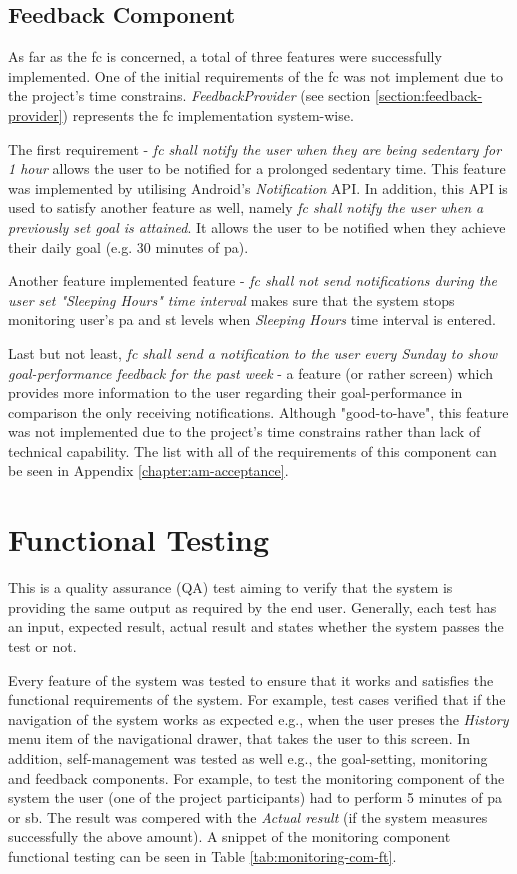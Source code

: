 \subsection{Feedback Component}
As far as the \gls{fc} is concerned, a total of three features were successfully implemented. One of the initial requirements of the \gls{fc} was not implement due to the project's time constrains. \textit{FeedbackProvider} (see section \ref{section:feedback-provider}) represents the \gls{fc} implementation system-wise.

The first requirement - \textit{\gls{fc} shall notify the user when they are being sedentary for 1 hour} allows the user to be notified for a prolonged sedentary time. This feature was implemented by utilising Android's \textit{Notification} API. In addition, this API is used to satisfy another feature as well, namely \textit{\gls{fc} shall notify the user when a previously set goal is attained}. It allows the user to be notified when they achieve their daily goal (e.g. 30 minutes of \gls{pa}).

Another feature implemented feature - \textit{\gls{fc} shall not send notifications during the user set "Sleeping Hours" time interval} makes sure that the system stops monitoring user's \gls{pa} and \gls{st} levels when \textit{Sleeping Hours} time interval is entered. 

Last but not least, \textit{\gls{fc} shall send a notification to the user every Sunday to show goal-performance feedback for the past week} - a feature (or rather screen) which provides more information to the user regarding their goal-performance in comparison the only receiving notifications. Although "good-to-have", this feature was not implemented due to the project's time constrains rather than lack of technical capability. The list with all of the requirements of this component can be seen in Appendix \ref{chapter:am-acceptance}.

\section{Functional Testing}
This is a quality assurance (QA) test aiming to verify that the system is providing the same output as required by the end user. Generally, each test has an input, expected result, actual result and states whether the system passes the test or not.

Every feature of the system was tested to ensure that it works and satisfies the functional requirements of the system. For example, test cases verified that if the navigation of the system works as expected e.g., when the user preses the \textit{History} menu item of the navigational drawer, that takes the user to this screen. In addition, self-management was tested as well e.g., the goal-setting, monitoring and feedback components. For example, to test the monitoring component of the system the user (one of the project participants) had to perform 5 minutes of \gls{pa} or \gls{sb}. The result was compered with the \textit{Actual result} (if the system measures successfully the above amount). A snippet of the monitoring component functional testing can be seen in Table \ref{tab:monitoring-com-ft}.

